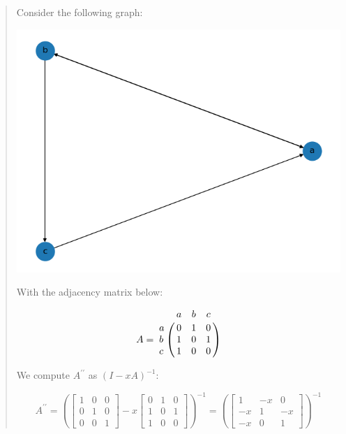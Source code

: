 \documentclass[12pt]{article}
\begin{document}
\begin{quote}
    Consider the following graph:

    \begin{center}
        \includegraphics[scale=0.5]{media/Figure_3.png}
    \end{center}

    With the adjacency matrix below:

    \[
        A =
        \bordermatrix{
            & a & b & c \cr
            a & 0 & 1 & 0 \cr
            b & 1 & 0 & 1 \cr
            c & 1 & 0 & 0 \cr
        }
    \]

    We compute $A^{\prime \prime}$ as $(I - xA)^{-1}$:

    \[
        A^{\prime \prime} =
        \left(
            \begin{bmatrix}
                1 & 0 & 0 \\
                0 & 1 & 0 \\
                0 & 0 & 1
            \end{bmatrix}
            -
            x
            \begin{bmatrix}
                0 & 1 & 0 \\
                1 & 0 & 1 \\
                1 & 0 & 0
            \end{bmatrix}
        \right)^{-1}
        =
        \left(
            \begin{bmatrix}
                1 & -x & 0 \\
                -x & 1 & -x \\
                -x & 0 & 1
            \end{bmatrix}
        \right)^{-1}
    \]


\end{quote}
\end{document}
